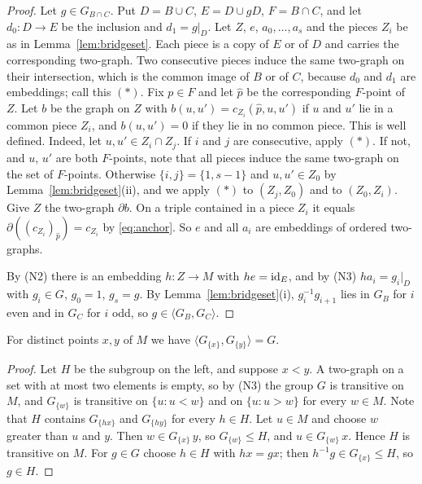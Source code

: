 \begin{proof}
Let $g\in G_{B\cap C}$. Put $D=B\cup C$, $E=D\cup gD$, $F=B\cap C$, and let
$d_0\colon D\to E$ be the inclusion and $d_1=g|_D$. Let $Z$, $e$,
$a_0,\dots,a_s$ and the pieces $Z_i$ be as in Lemma~\ref{lem:bridgeset}. Each
piece is a copy of $E$ or of $D$ and carries the corresponding two-graph.
Two consecutive pieces induce the same two-graph on their intersection, which
is the common image of $B$ or of $C$, because $d_0$ and $d_1$ are embeddings;
call this $(\ast)$. Fix $p\in F$ and let $\hat p$ be the corresponding
$F$-point of $Z$. Let $b$ be the graph on $Z$ with
$b(u,u')=c_{Z_i}(\hat p,u,u')$ if $u$ and $u'$ lie in a common piece $Z_i$, and
$b(u,u')=0$ if they lie in no common piece. This is well defined. Indeed, let
$u,u'\in Z_i\cap Z_j$. If $i$ and $j$ are consecutive, apply $(\ast)$. If not,
and $u$, $u'$ are both $F$-points, note that all pieces induce the same
two-graph on the set of $F$-points. Otherwise $\{i,j\}=\{1,s-1\}$ and
$u,u'\in Z_0$ by Lemma~\ref{lem:bridgeset}(ii), and we apply $(\ast)$ to
$(Z_j,Z_0)$ and to $(Z_0,Z_i)$. Give $Z$ the two-graph $\partial b$. On a
triple contained in a piece $Z_i$ it equals $\partial((c_{Z_i})_{\hat p})=c_{Z_i}$
by \eqref{eq:anchor}. So $e$ and all $a_i$ are embeddings of ordered
two-graphs.

By (N2) there is an embedding $h\colon Z\to M$ with $he=\mathrm{id}_E$, and by (N3)
$ha_i=g_i|_D$ with $g_i\in G$, $g_0=1$, $g_s=g$. By
Lemma~\ref{lem:bridgeset}(i), $g_i^{-1}g_{i+1}$ lies in $G_B$ for $i$ even and
in $G_C$ for $i$ odd, so $g\in\langle G_B,G_C\rangle$.
\end{proof}

\begin{lemma}\label{lem:stab2b}
For distinct points $x,y$ of $M$ we have $\langle G_{\{x\}},G_{\{y\}}\rangle=G$.
\end{lemma}

\begin{proof}
Let $H$ be the subgroup on the left, and suppose $x<y$. A two-graph on a set
with at most two elements is empty, so by (N3) the group $G$ is transitive on
$M$, and $G_{\{w\}}$ is transitive on $\{u:u<w\}$ and on $\{u:u>w\}$ for every
$w\in M$. Note that $H$ contains $G_{\{hx\}}$ and $G_{\{hy\}}$ for every
$h\in H$. Let $u\in M$ and choose $w$ greater than $u$ and $y$. Then
$w\in G_{\{x\}}\,y$, so $G_{\{w\}}\le H$, and $u\in G_{\{w\}}\,x$. Hence $H$
is transitive on $M$. For $g\in G$ choose $h\in H$ with $hx=gx$; then
$h^{-1}g\in G_{\{x\}}\le H$, so $g\in H$.
\end{proof}


